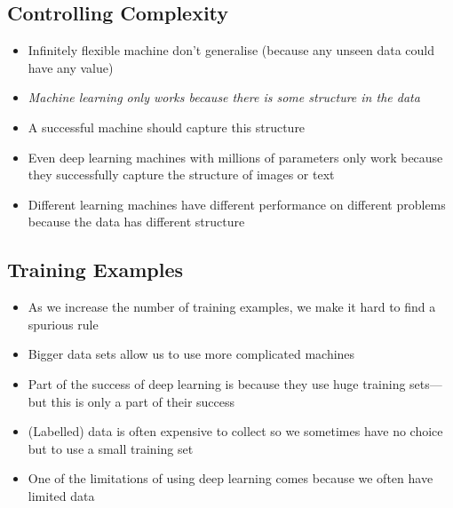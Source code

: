 \Outline %

\begin{slide}
\section{Controlling Complexity}

\begin{PauseHighLight}
  \begin{itemize}
  \item Infinitely flexible machine don't generalise\pause{} (because
    any unseen data could have any value)\pauseb
  \item \emph{Machine learning only works because there is
      some structure in the data}\pause
  \item A successful machine should capture this structure\pause
  \item Even deep learning machines with millions of parameters only
    work because they successfully capture the structure of images or
    text\pause
  \item Different learning machines have different performance on
    different problems because the data has different structure\pause
  \end{itemize}
\end{PauseHighLight}

\end{slide}




\begin{slide}
\section{Training Examples}

\begin{PauseHighLight}
  \begin{itemize}
  \item As we increase the number of training examples, we make it hard
    to find a spurious rule\pause
  \item Bigger data sets allow us to use more complicated
    machines\pause
  \item Part of the success of deep learning is because they use huge
    training sets\pause---but this is only a part of their success\pauseb
  \item (Labelled) data is often expensive to collect so we
    sometimes have no choice but to use a small training set\pause
  \item One of the limitations of using deep learning comes because we often
    have limited data\pause
  \end{itemize}
\end{PauseHighLight}

\end{slide}


